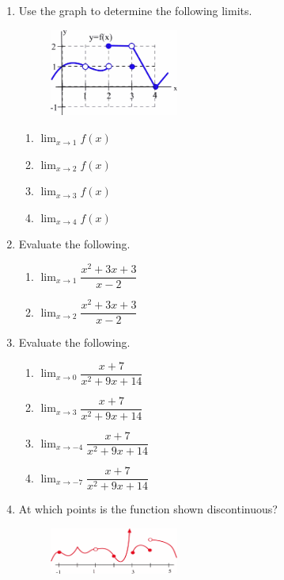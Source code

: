 \begin{example}
\begin{enumerate}
    \item	Use the graph to determine the following limits.
    \begin{figure}[!ht]
    \centering
    \includegraphics[width=0.4\textwidth]{img/chap2/image017.png}
    \end{figure}
    \begin{enumerate}[label=(\alph*)]
    \item $\displaystyle\lim_{x\to 1} f(x)$
    \item $\displaystyle\lim_{x\to 2} f(x)$
    \item $\displaystyle\lim_{x\to 3} f(x)$
    \item $\displaystyle\lim_{x\to 4} f(x)$
    \end{enumerate}


    \item	Evaluate the following. 
    \begin{enumerate}[label=(\alph*)]
    \item $\displaystyle\lim_{x\to 1}\dfrac{x^2 + 3x + 3}{x-2}$ 
    \item $\displaystyle\lim_{x\to 2}\dfrac{x^2 + 3x + 3}{x-2}$ 
    \end{enumerate}

    \item	Evaluate the following.
    \begin{enumerate}[label=(\alph*)]
    \item $\displaystyle\lim_{x\to 0}\dfrac{x + 7}{x^2+9x+14}$ 
    \item $\displaystyle\lim_{x\to 3}\dfrac{x + 7}{x^2+9x+14}$ 
    \item $\displaystyle\lim_{x\to -4}\dfrac{x + 7}{x^2+9x+14}$ 
    \item $\displaystyle\lim_{x\to -7}\dfrac{x + 7}{x^2+9x+14}$  
    \end{enumerate}


    \item At which points is the function shown discontinuous?

    \begin{figure}[!ht]
    \centering
    \includegraphics[width=0.4\textwidth]{img/chap2/image018.png}
    \end{figure}


\end{enumerate}
\end{example}
